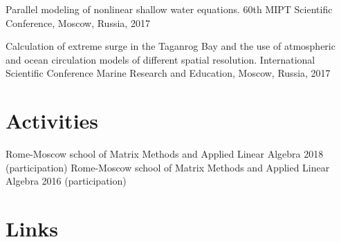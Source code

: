\documentclass[10pt,a4paper]{moderncv}
\begin{document}
\cvlistitem
{Parallel modeling of nonlinear shallow water equations. 60th MIPT Scientific Conference, Moscow, Russia, 2017}

\cvlistitem
{Calculation of extreme surge in the Taganrog Bay and the use of atmospheric and ocean circulation models of different spatial resolution. International Scientific Conference Marine Research and Education, Moscow, Russia, 2017}

\section{Activities}
\cvlistitem
{Rome-Moscow school of Matrix Methods and Applied Linear Algebra 2018 (participation)}
\cvlistitem
{Rome-Moscow school of Matrix Methods and Applied Linear Algebra 2016 (participation)}

\section{Links}
\end{document}
